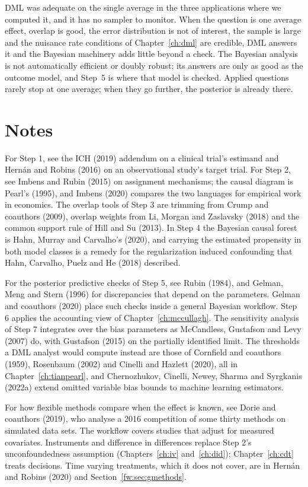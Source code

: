 DML was adequate on the single average in the three applications where we computed it, and it has no sampler to monitor. When the question is one average effect, overlap is good, the error distribution is not of interest, the sample is large and the nuisance rate conditions of Chapter~\ref{ch:dml} are credible, DML answers it and the Bayesian machinery adds little beyond a check. The Bayesian analysis is not automatically efficient or doubly robust; its answers are only as good as the outcome model, and Step~5 is where that model is checked. Applied questions rarely stop at one average; when they go further, the posterior is already there.

\section*{Notes}

For Step 1, see the ICH (2019) addendum on a clinical trial's estimand and Hern\'an and Robins (2016) on an observational study's target trial. For Step 2, see Imbens and Rubin (2015) on assignment mechanisms; the causal diagram is Pearl's (1995), and Imbens (2020) compares the two languages for empirical work in economics. The overlap tools of Step 3 are trimming from Crump and coauthors (2009), overlap weights from Li, Morgan and Zaslavsky (2018) and the common support rule of Hill and Su (2013). In Step 4 the Bayesian causal forest is Hahn, Murray and Carvalho's (2020), and carrying the estimated propensity in both model classes is a remedy for the regularization induced confounding that Hahn, Carvalho, Puelz and He (2018) described.

For the posterior predictive checks of Step 5, see Rubin (1984), and Gelman, Meng and Stern (1996) for discrepancies that depend on the parameters. Gelman and coauthors (2020) place such checks inside a general Bayesian workflow. Step 6 applies the accounting view of Chapter~\ref{ch:mccullagh}. The sensitivity analysis of Step 7 integrates over the bias parameters as McCandless, Gustafson and Levy (2007) do, with Gustafson (2015) on the partially identified limit. The thresholds a DML analyst would compute instead are those of Cornfield and coauthors (1959), Rosenbaum (2002) and Cinelli and Hazlett (2020), all in Chapter~\ref{ch:tianpearl}, and Chernozhukov, Cinelli, Newey, Sharma and Syrgkanis (2022a) extend omitted variable bias bounds to machine learning estimators.

For how flexible methods compare when the effect is known, see Dorie and coauthors (2019), who analyse a 2016 competition of some thirty methods on simulated data sets. The workflow covers studies that adjust for measured covariates. Instruments and difference in differences replace Step 2's unconfoundedness assumption (Chapters~\ref{ch:iv} and~\ref{ch:did}); Chapter~\ref{ch:cdt} treats decisions. Time varying treatments, which it does not cover, are in Hern\'an and Robins (2020) and Section~\ref{fw:sec:gmethods}.
